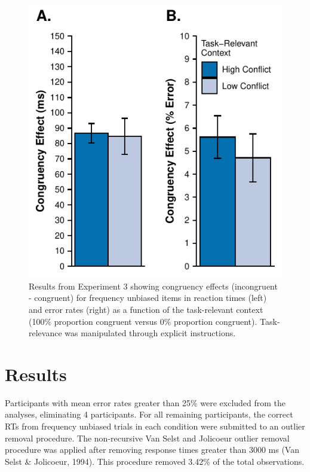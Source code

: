 \documentclass[english,,man,floatsintext]{apa6}
\begin{document}
\begin{figure}
\centering
\includegraphics{manuscript_files/figure-latex/figure4-1.pdf}
\caption{\label{fig:figure4}Results from Experiment 3 showing congruency effects (incongruent - congruent) for frequency unbiased items in reaction times (left) and error rates (right) as a function of the task-relevant context (100\% proportion congruent versus 0\% proportion congruent). Task-relevance was manipulated through explicit instructions.}
\end{figure}



\hypertarget{results-2}{%
\section{Results}\label{results-2}}

Participants with mean error rates greater than 25\% were excluded from the analyses, eliminating 4 participants. For all remaining participants, the correct RTs from frequency unbiased trials in each condition were submitted to an outlier removal procedure. The non-recursive Van Selst and Jolicoeur outlier removal procedure was applied after removing response times greater than 3000 ms (Van Selst \& Jolicoeur, 1994). This procedure removed 3.42\% of the total observations.
\end{document}

